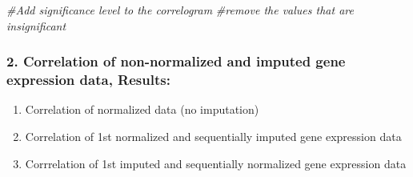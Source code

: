 \documentclass[
]{article}
\newenvironment{Shaded}{\begin{snugshade}}{\end{snugshade}}
\newcommand{\CommentTok}[1]{\textcolor[rgb]{0.56,0.35,0.01}{\textit{#1}}}
\providecommand{\tightlist}{%
  \setlength{\itemsep}{0pt}\setlength{\parskip}{0pt}}
\begin{document}
\begin{Shaded}
\begin{Highlighting}[]
  \CommentTok{\#Add significance level to the correlogram}
\CommentTok{\#remove the values that are insignificant}
\end{Highlighting}
\end{Shaded}

\hypertarget{correlation-of-non-normalized-and-imputed-gene-expression-data-results}{%
\subsubsection{2. Correlation of non-normalized and imputed gene
expression data,
Results:}\label{correlation-of-non-normalized-and-imputed-gene-expression-data-results}}

\begin{enumerate}
\def\labelenumi{\arabic{enumi}.}
\setcounter{enumi}{2}
\tightlist
\item
  Correlation of normalized data (no imputation)
\item
  Correlation of 1st normalized and sequentially imputed gene expression
  data
\item
  Corrrelation of 1st imputed and sequentially normalized gene
  expression data
\end{enumerate}
\end{document}
